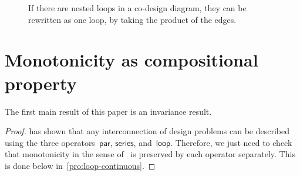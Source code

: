\documentclass[twocolumn,english]{IEEEtran}
\theoremstyle{definition}
\theoremstyle{plain}
\theoremstyle{definition}
\theoremstyle{remark}
\theoremstyle{definition}
\theoremstyle{plain}
\theoremstyle{plain}
\newtheorem{thm}{\protect\theoremname}
\newcommand{\aword}[1]{\mathsf{#1}}
\newcommand{\vmath}[1]{\aword{#1}}
\newcommand{\dpseries}{\vmath{series}}
\newcommand{\dppar}{\vmath{par}}
\newcommand{\dploop}{\vmath{loop}}
\providecommand{\theoremname}{Theorem}
\begin{document}
\begin{figure}[H]
\caption{\label{fig:If-there-are}If there are nested loops in a co-design
diagram, they can be rewritten as one loop, by taking the product
of the edges.}
\end{figure}





\section{Monotonicity as compositional property\label{sec:Monotone-Co-Design-Problems}}

The first main result of this paper is an invariance result. 

 

\noindent 
{}

\begin{proof}
 has shown that any interconnection of design
problems can be described using the three operators~$\dppar$, $\dpseries$,
and~$\dploop$. Therefore, we just need to check that monotonicity
in the sense of~ is preserved by each operator
separately. This is done below in~\textendash \ref{pro:loop-continuous}. 
\end{proof}
\end{document}
